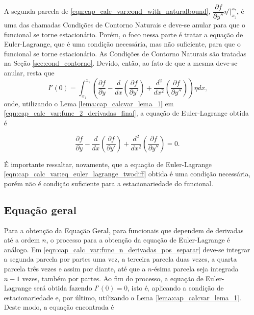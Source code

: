 \documentclass[
	12pt,				%
	openright,			%
    twoside,			%
	a4paper,			%
	chapter=TITLE,		%
	english,			%
	french,				%
	spanish,			%
	brazil				%
	]{abntex2}
\numberwithin{lema}{chapter}
\numberwithin{teorema}{chapter}
\numberwithin{definicao}{chapter}
\numberwithin{exemplo}{chapter}
\numberwithin{figure}{chapter}
\begin{document}
A segunda parcela de \eqref{eqn:cap_calc_var:cond_with_naturalbound}, $\dfrac{\partial f}{\partial y''}\eta '\Big|_{x_1}^{x_2}$, é uma das chamadas Condições de Contorno Naturais e deve-se anular para que o funcional se torne estacionário. Porém, o foco nessa parte é tratar a equação de Euler-Lagrange, que é uma condição necessária, mas não suficiente, para que o funcional se torne estacionário. As Condições de Contorno Naturais são tratadas na Seção \ref{sec:cond_contorno}. Devido, então, ao fato de que a mesma deve-se anular, resta que
\begin{equation}
	\label{eqn:cap_calc_var:func_2_derivadas_final}
	I'(0)=
	\int_{x_1}^{x_2}
	\left (
		\frac{\partial f}{\partial y}
	-
		\frac{d}{dx}\left (
			\frac{\partial f}{\partial y'}
		\right )
	+
		\frac{d^2}{dx^2}\left (
			\frac{\partial f}{\partial y''}
		\right )
	\right ) \eta dx
	\text{,}
\end{equation}
onde, utilizando o Lema \ref{lema:cap_calcvar_lema_1} em \eqref{eqn:cap_calc_var:func_2_derivadas_final}, a equação de Euler-Lagrange obtida é

\begin{equation}
	\label{eqn:cap_calc_var:eq_euler_lagrange_twodiff}
	\frac{\partial f}{\partial y}
	-
	\frac{d}{dx}\left (
		\frac{\partial f}{\partial y'}
	\right )
	+
	\frac{d^2}{dx^2}\left (
		\frac{\partial f}{\partial y''}
	\right )
	=0 \text{.}
\end{equation}

É importante ressaltar, novamente, que a equação de Euler-Lagrange \eqref{eqn:cap_calc_var:eq_euler_lagrange_twodiff} obtida é uma condição necessária, porém não é condição suficiente para a estacionariedade do funcional.

\subsection{Equação geral}

Para a obtenção da Equação Geral, para funcionais que dependem de derivadas até a ordem $n$, o processo para a obtenção da equação de Euler-Lagrange é análogo. Em \eqref{eqn:cap_calc_var:func_n_derivadas_pos_separar} deve-se integrar a segunda parcela por partes uma vez, a terceira parcela duas vezes, a quarta parcela três vezes e assim por diante, até que a $n$-ésima parcela seja integrada $n-1$ vezes, também por partes. Ao fim do processo, a equação de Euler-Lagrange será obtida fazendo $I'(0)=0$, isto é, aplicando a condição de estacionariedade e, por último, utilizando o Lema \ref{lema:cap_calcvar_lema_1}. Deste modo, a equação encontrada é
\end{document}
